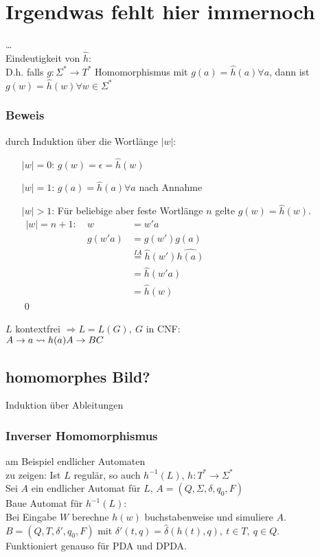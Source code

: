 \section{Irgendwas fehlt hier immernoch}
    \dots\\
    Eindeutigkeit von $\hat{h}$:\\
    D.h. falls $g:\Sigma^*\rightarrow T^*$ Homomorphismus mit $g(a)=\hat{h}(a)\forall a$, dann ist $g(w)=\hat{h}(w)\forall w\in\Sigma^*$
    \subsubsection{Beweis}
        durch Induktion über die Wortlänge $|w|$:
        \begin{itemize}
            \item[$|w|=0$:] $g(w)=\epsilon=\hat{h}(w)$
            \item[$|w|=1$:] $g(a)=\hat{h}(a)\forall a$ nach Annahme
            \item[$|w|>1$:] Für beliebige aber feste Wortlänge $n$ gelte $g(w)=\hat{h}(w)$.\\
            \begin{math}
            \begin{array}{lrl}
                |w|=n+1:\ & w&=w'a \\
                & g(w'a) &= g(w')g(a)\\
                && \overset{IA}{=} \hat{h}(w')\hat{h(a)}\\
                && = \hat{h}(w'a)\\
                &&=\hat{h}(w)
            \end{array}
            \end{math}\\\hfill\qed
        \end{itemize}
    $L$ kontextfrei $\Rightarrow L=L(G),\ G$ in CNF:\\
    $A\rightarrow a\leadsto h(a)\\ A\rightarrow BC$
    \subsection{homomorphes Bild?}
    Induktion über Ableitungen\\
    \subsubsection{Inverser Homomorphismus}
    am Beispiel endlicher Automaten\\
    zu zeigen: Ist $L$ regulär, so auch $h^{-1}(L)$, $h: T^*\rightarrow \Sigma^*$\\
    Sei $A$ ein endlicher Automat für $L$, $A=(Q,\Sigma,\delta,q_0,F)$\\
    Baue Automat für $h^{-1}(L)$:\\
    Bei Eingabe $W$ berechne $h(w)$ buchstabenweise und simuliere $A$. $B=(Q,T,\delta',q_0,F)$ mit $\delta'(t,q)=\hat{\delta}(h(t),q),\ t\in T,\ q\in Q$.\\
    Funktioniert genauso für PDA und DPDA.
